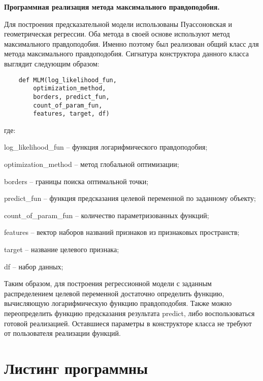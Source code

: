 \textbf{Программная реализация метода максимального правдоподобия.}

Для построения предсказательной модели использованы Пуассоновская и геометрическая регрессии. Оба метода в своей основе используют метод максимального правдоподобия. Именно поэтому был реализован общий класс для метода максимального правдоподобия. Сигнатура конструктора данного класса выглядит следующим образом:

\begin{verbatim}
    def MLM(log_likelihood_fun,
        optimization_method,
        borders, predict_fun,
        count_of_param_fun,
        features, target, df)
\end{verbatim}
где:
\begin{description}[font=$\bullet$]
    \item log\_likelihood\_fun -- функция логарифмического правдоподобия;
    \item optimization\_method -- метод глобальной оптимизации;
    \item borders -- границы поиска оптимальной точки;
    \item predict\_fun -- функция предсказания целевой переменной по заданному объекту;
    \item count\_of\_param\_fun -- количество параметризованных функций;
    \item features -- вектор наборов названий признаков из признаковых пространств;
    \item target -- название целевого признака;
    \item df -- набор данных;
\end{description}

Таким образом, для построения регрессионной модели с заданным распределением целевой переменной достаточно определить функцию, вычисляющую логарифмическую функцию правдоподобия. Также можно переопределить функцию предсказания результата predict, либо воспользоваться готовой реализацией. Оставшиеся параметры в конструкторе класса не требуют от пользователя реализации функций.

\section*{Листинг программны}

